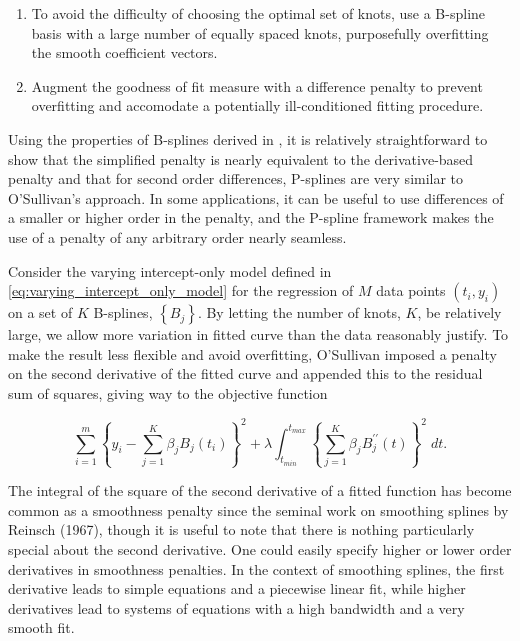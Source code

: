 \documentclass[12pt]{article}
\newcommand*\needsparaphrased{\color{red}}
\theoremstyle{definition}
\begin{document}
\begin{enumerate}
\item To avoid the difficulty of choosing the optimal set of knots, use a B-spline basis with a large number of equally spaced knots, purposefully overfitting the smooth coefficient vectors. 
\item Augment the goodness of fit measure with a difference penalty to prevent overfitting and accomodate a potentially ill-conditioned fitting procedure.
\end{enumerate}  
 
Using the properties of B-splines derived in {\needsparaphrased{B-spline section}}, it is relatively straightforward to show that the simplified penalty is nearly equivalent to the derivative-based penalty and that for second order differences, P-splines are very similar to O'Sullivan's approach. In some applications, it can be useful to use differences of a smaller or higher order in the penalty, and the P-spline framework makes the use of a penalty of any arbitrary order nearly seamless. 
 
Consider the varying intercept-only model defined in \ref{eq:varying_intercept_only_model} for the regression of $M$ data points $\left(t_i,y_i\right)$ on a set of $K$ B-splines, $\left\{B_j\right\}$.  By letting the number of knots, $K$, be relatively large, we allow more variation in fitted curve than the data reasonably justify. To make the result less flexible and avoid overfitting, O'Sullivan imposed a penalty on the second derivative of the fitted curve and appended this to the residual sum of squares, giving way to the objective function

\begin{equation} \label{eq:univariate_bspline_ridge_penalty}
\sum_{i=1}^m \left \{ y_i - \sum_{j=1}^K \beta_j B_j\left(t_i\right) \right \}^2 + \lambda \int_{t_{min}}^{t_{max}} \left\{  \sum_{j=1}^K \beta_j B^{\prime \prime}_j\left(t\right) \right\}^2 \; dt.
\end{equation}

The integral of the square of the second derivative of a fitted function has become common as a smoothness penalty since the seminal work on smoothing splines by Reinsch (1967), though it is useful to note that there is nothing particularly special about the second derivative. One could easily specify higher or lower order derivatives in smoothness penalties. In the context of smoothing splines, the first derivative leads to simple equations and a piecewise linear fit, while higher derivatives lead to systems of equations with a high bandwidth and a very smooth fit. 
\end{document}
